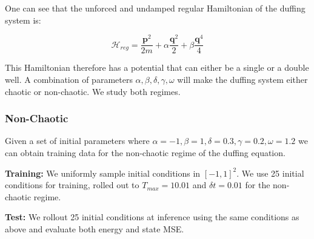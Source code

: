 \documentclass[twoside]{article}
\begin{document}
One can see that the unforced and undamped regular Hamiltonian of the duffing system is:

\begin{equation}
\mathcal{H}_{reg} = \frac{\mathbf{p}^2}{2m}+ \alpha \frac{\mathbf{q}^2}{2} + \beta \frac{\mathbf{q}^4}{4}
\end{equation}

This Hamiltonian therefore has a potential that can either be a single or a double well. A combination of parameters $\alpha,\beta,\delta,\gamma,\omega$ will make the duffing system either chaotic or non-chaotic. We study both regimes.

\subsubsection{Non-Chaotic}

Given a set of initial parameters where $\alpha =-1,\beta=1,\delta=0.3,\gamma=0.2,\omega=1.2$ we can obtain training data for the non-chaotic regime of the duffing equation. 

\textbf{Training:} We uniformly sample initial conditions in $[-1,1]^2$. We use 25 initial conditions for training, rolled out to $T_{max}=10.01$ and $\delta t =0.01$ for the non-chaotic regime. 

\textbf{Test:} We rollout 25 initial conditions at inference using the same conditions as above and evaluate both energy and state MSE.
\end{document}
